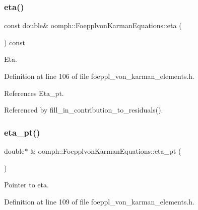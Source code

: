 \mbox{\label{classoomph_1_1FoepplvonKarmanEquations_ac13007de5218847c3059c0c8971aec75}} 
\subsubsection{\texorpdfstring{eta()}{eta()}}
{\footnotesize\ttfamily const double\& oomph\+::\+Foepplvon\+Karman\+Equations\+::eta (\begin{DoxyParamCaption}{ }\end{DoxyParamCaption}) const\hspace{0.3cm}{\ttfamily [inline]}}



Eta. 



Definition at line 106 of file foeppl\+\_\+von\+\_\+karman\+\_\+elements.\+h.



References Eta\+\_\+pt.



Referenced by fill\+\_\+in\+\_\+contribution\+\_\+to\+\_\+residuals().

\mbox{\label{classoomph_1_1FoepplvonKarmanEquations_a14eacc9306ffdbd6eff320f2d2b27702}} 
\subsubsection{\texorpdfstring{eta\+\_\+pt()}{eta\_pt()}}
{\footnotesize\ttfamily double$\ast$ \& oomph\+::\+Foepplvon\+Karman\+Equations\+::eta\+\_\+pt (\begin{DoxyParamCaption}{ }\end{DoxyParamCaption})\hspace{0.3cm}{\ttfamily [inline]}}



Pointer to eta. 



Definition at line 109 of file foeppl\+\_\+von\+\_\+karman\+\_\+elements.\+h.



